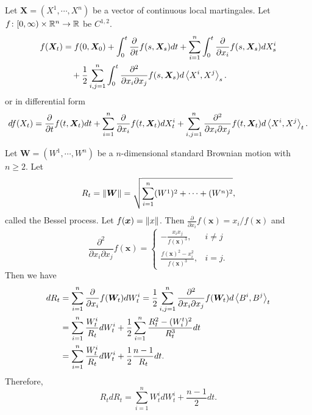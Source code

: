 \begin{thm}
    Let $\bm{X} = (X^1,\cdots,X^n)$ be a vector of continuous local martingales. Let $f \colon [0,\infty) \times \mathbb{R}^{n} \rightarrow \mathbb{R}$ be $C^{1,2}$.
    \begin{align*}
        f(\bm{X}_t) &= f(0,\bm{X}_0) + \int_0^t \frac{\partial}{\partial t} f(s,\bm{X}_s)dt + \sum_{i=1}^n \int_0^t \frac{\partial}{\partial x_i} f(s,\bm{X}_s)dX_s^i \\ 
        &\quad + \frac{1}{2}\sum_{i,j=1}^n\int_0^t \frac{\partial^2}{\partial x_i \partial x_j}f(s,\bm{X}_s)d\left\langle X^i,X^j \right\rangle_s.
    \end{align*}
    or in differential form
    \begin{equation*}
        df(X_t) = \frac{\partial}{\partial t} f(t,\bm{X}_t)dt + \sum_{i=1}^n\frac{\partial}{\partial x_i} f(t,\bm{X}_t)dX_t^i+\sum_{i,j=1}^n\frac{\partial^2}{\partial x_i \partial x_j}f(t,\bm{X}_t)d\left\langle X^i,X^j \right\rangle_t.
    \end{equation*}
\end{thm}

\begin{exam}
    Let $\bm{W} = (W^1,\cdots,W^n)$ be a $n$-dimensional standard Brownian motion with $n \geq 2$. Let
    \begin{equation*}
        R_t = \left\lVert\bm{W}\right\lVert = \sqrt{\sum_{i=1}^n (W^1)^2 + \cdots + (W^n)^2},
    \end{equation*}
    called the Bessel process. Let $f(\bm{x}) = \left\lVert x\right\lVert$. Then $\frac{\partial}{\partial x_i}f(\bm{x}) = x_i / f(\bm{x})$ and 
    \begin{equation*}
        \frac{\partial^2}{\partial x_i \partial x_j}f(\bm{x}) = \begin{cases}
            -\frac{x_ix_j}{f(\bm{x})^3},& i \neq j \\
            \frac{f(\bm{x})^2 - x_i^2}{f(\bm{x})^3},&i=j.
        \end{cases}
    \end{equation*}
    Then we have
    \begin{align*}
        dR_t & = \sum_{i=1}^n \frac{\partial}{\partial x_i}f(\bm{W}_t) dW^i_t = \frac{1}{2} \sum_{i,j = 1}^n \frac{\partial^2}{\partial x_i \partial x_j}f(\bm{W}_t)d \left\langle B^i,B^j \right\rangle_t \\
        &= \sum_{i=1}^n \frac{W^i_t}{R_t} dW^i_t + \frac{1}{2} \sum_{i=1}^n \frac{R_t^2 - (W^t_i)^2}{R_t^3}dt \\
        &= \sum_{i=1}^n \frac{W^i_t}{R_t} dW^i_t + \frac{1}{2} \frac{n- 1}{R_t}dt.
    \end{align*}
    Therefore,
    \begin{equation*}
        R_t dR_t = \sum_{i=1}^n W^i_t dW^i_t + \frac{n-1}{2}dt.
    \end{equation*}
\end{exam}


